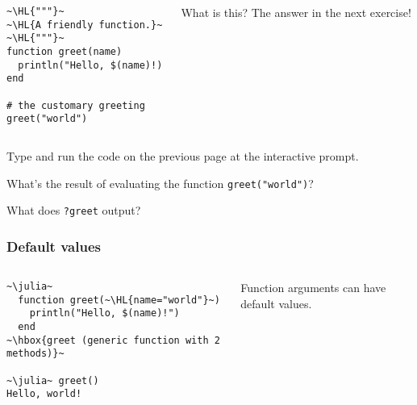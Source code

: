 \documentclass[english,serif,mathserif,xcolor=pdftex,dvipsnames,table]{beamer}
\newcounter{prompt}
\begin{document}
\begin{frame}[fragile]
  \begin{columns}[t]
    \begin{column}{0.5\textwidth}
\begin{lstlisting}
~\HL{"""}~
~\HL{A friendly function.}~
~\HL{"""}~
function greet(name)
  println("Hello, $(name)!)
end

# the customary greeting
greet("world")
\end{lstlisting}
    \end{column}
    \begin{column}{0.5\textwidth}
      \raggedleft
      What is this? The answer in the next exercise!
    \end{column}
  \end{columns}
\end{frame}


\begin{frame}
  \begin{exercise*}[2.A]
    Type and run the code on the previous page at the interactive
    prompt.

    \+
    What's the result of evaluating the function \texttt{greet("world")}?

    \+
    What does \texttt{?greet} output?
  \end{exercise*}
\end{frame}

\begin{frame}[fragile]
  \frametitle{Default values}
  \begin{columns}[t]
    \begin{column}{0.5\textwidth}
\begin{lstlisting}
~\julia~
  function greet(~\HL{name="world"}~)
    println("Hello, $(name)!")
  end
~\hbox{greet (generic function with 2 methods)}~

~\julia~ greet()
Hello, world!
\end{lstlisting}
    \end{column}
    \begin{column}{0.5\textwidth}
      \raggedleft
      Function arguments can have default values.
    \end{column}
  \end{columns}
\end{frame}

\end{document}
